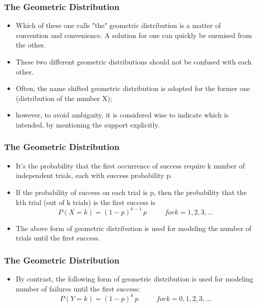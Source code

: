 \documentclass[12pt]{beamer}
\begin{document}
\begin{frame}
\frametitle{The Geometric Distribution}
\Large
\begin{itemize}
\item Which of these one calls "the" geometric distribution is a matter of convention and convenience. A solution for one can quickly be surmised from the other.
\item These two different geometric distributions should not be confused with each other. 
\item Often, the name shifted geometric distribution is adopted for the former one (distribution of the number X); 
\item however, to avoid ambiguity, it is considered wise to indicate which is intended, by mentioning the support explicitly.
\end{itemize}
\end{frame}
\begin{frame}
\frametitle{The Geometric Distribution}
\Large
\begin{itemize}
\item It’s the probability that the first occurrence of success require k number of independent trials, each with success probability p. 

\item If the probability of success on each trial is p, then the probability that the kth trial (out of k trials) is the first success is
\[  P(X = k) = (1-p)^{k-1}\,p\, \phantom{space} for k = 1, 2, 3, \ldots \]


\item The above form of geometric distribution is used for modeling the number of trials until the first success. 
\end{itemize}
\end{frame}
\begin{frame}
\frametitle{The Geometric Distribution}
\Large
\begin{itemize}
\item By contrast, the following form of geometric distribution is used for modeling number of failures until the first success:
\[ P(Y=k) = (1 - p)^k\,p\, \phantom{space} for k = 0, 1, 2, 3, \ldots\]
\end{itemize}
\end{frame}
\end{document}

